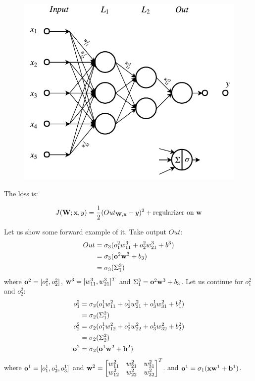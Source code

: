 \documentclass[11pt,a4paper]{article}
\begin{document}
\begin{figure}[h!]
	\includegraphics[scale=0.75]{figs/nn}
	\centering
\end{figure}

The loss is:

\begin{equation}
J(\mathbf{W}; \mathbf{x}, y) = \frac{1}{2} (Out_{\mathbf{W},\mathbf{x}} - y)^2 + \text{regularizer on } \mathbf{w}
\end{equation}

Let us show some forward example of it. Take output $Out$:
\begin{align}
Out &= \sigma_3(o^2_1w^3_{11} + o^2_2w^3_{21} + b^3)\\
&= \sigma_3(\mathbf{o}^2\mathbf{w}^3 + b_3)\\
&= \sigma_3(\Sigma^3_1)
\end{align}
where $\mathbf{o}^2 = [o^2_1, o^2_2]$, $\mathbf{w}^3 = [w^3_{11}, w^3_{21}]^T$ and $\Sigma^3_1 = \mathbf{o}^2\mathbf{w}^3 + b_3$.
Let us continue for $o^2_1$ and $o^2_2$:
\begin{align}
o^2_1 &= \sigma_2(o^1_1w^2_{11} + o^1_2w^2_{21} + o^1_3w^2_{31} + b^2_1)\\
&= \sigma_2(\Sigma^2_1)\\
o^2_2 &= \sigma_2(o^1_1w^2_{12} + o^1_2w^2_{22} + o^1_3w^2_{32} + b^2_2)\\
&= \sigma_2(\Sigma^2_2)\\
\mathbf{o}^2 &= \sigma_2(\mathbf{o}^1\mathbf{w}^2 + \mathbf{b}^2)
\end{align}
where $\mathbf{o}^1 = [o^1_1, o^1_2, o^1_3]$ and $\mathbf{w}^2 = \begin{bmatrix}
w^2_{11} & w^2_{21} & w^2_{31}\\
w^2_{12} & w^2_{22} & w^2_{32}
\end{bmatrix}^T$. and $\mathbf{o}^1 = \sigma_1(\mathbf{x}\mathbf{w}^1 + \mathbf{b}^1)$. 
\end{document}
